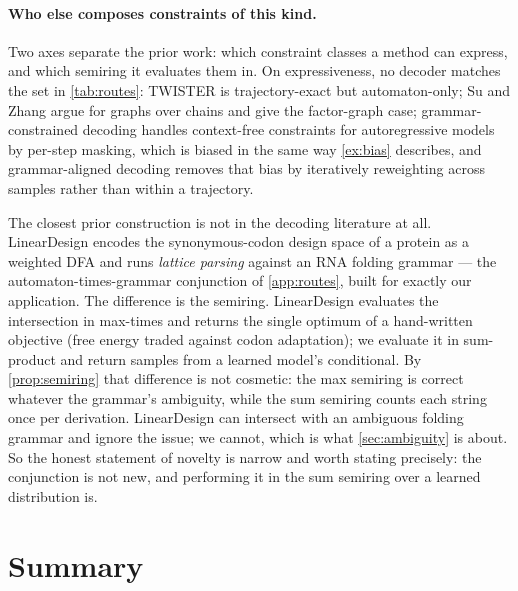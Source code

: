 \documentclass[11pt]{article}
\theoremstyle{definition}
\begin{document}
\paragraph{Who else composes constraints of this kind.}
Two axes separate the prior work: which constraint classes a method can express, and which semiring it
evaluates them in. On expressiveness, no decoder matches the set in \cref{tab:routes}: TWISTER
\cite{twister} is trajectory-exact but automaton-only; Su and Zhang \cite{sz26} argue for graphs over
chains and give the factor-graph case; grammar-constrained decoding \cite{geng2023} handles context-free
constraints for autoregressive models by per-step masking, which is biased in the same way
\cref{ex:bias} describes, and grammar-aligned decoding \cite{park2024} removes that bias by iteratively
reweighting across samples rather than within a trajectory.

The closest prior construction is not in the decoding literature at all. LinearDesign \cite{zhang2023}
encodes the synonymous-codon design space of a protein as a weighted DFA and runs \emph{lattice parsing}
against an RNA folding grammar --- the automaton-times-grammar conjunction of \cref{app:routes}, built for
exactly our application. The difference is the semiring. LinearDesign evaluates the intersection in
max-times and returns the single optimum of a hand-written objective (free energy traded against codon
adaptation); we evaluate it in sum-product and return samples from a learned model's conditional. By
\cref{prop:semiring} that difference is not cosmetic: the max semiring is correct whatever the grammar's
ambiguity, while the sum semiring counts each string once per derivation. LinearDesign can intersect with
an ambiguous folding grammar and ignore the issue; we cannot, which is what \cref{sec:ambiguity} is about.
So the honest statement of novelty is narrow and worth stating precisely: the conjunction is not new, and
performing it in the sum semiring over a learned distribution is.

\section{Summary}\label{sec:summary}
\end{document}
